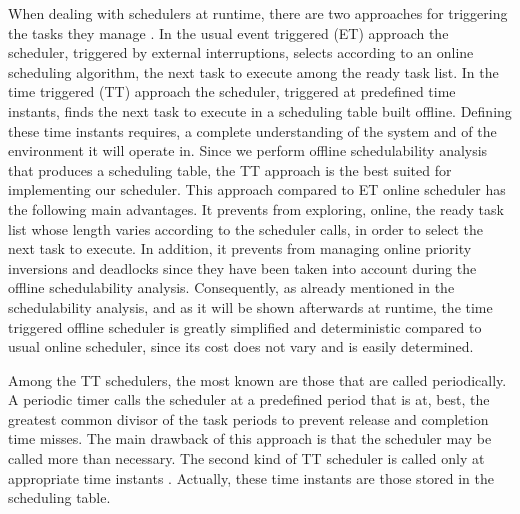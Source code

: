 \documentclass[conference,compsocconf]{IEEEtran}
\begin{document}
When dealing with schedulers at runtime, there are two approaches for
triggering the tasks they manage \cite{Kopetz98}. In the usual event triggered
(ET) approach the scheduler, triggered by external interruptions, selects
according to an online scheduling algorithm, the next task to execute among the
ready task list. In the time triggered (TT) approach the scheduler, triggered
at predefined time instants, finds the next task to execute in a scheduling
table built offline. Defining these time instants requires, a complete
understanding of the system and of the environment it will operate in.  Since
we perform offline schedulability analysis that produces a scheduling table,
the TT approach is the best suited for implementing our scheduler. This
approach compared to ET online scheduler has the following main advantages. It
prevents from exploring, online, the ready task list whose length varies
according to the scheduler calls, in order to select the next task to
execute. In addition, it prevents from managing online priority inversions and
deadlocks since they have been taken into account during the offline
schedulability analysis. Consequently, as already mentioned in the
schedulability analysis, and as it will be shown afterwards at runtime, the
time triggered offline scheduler is greatly simplified and deterministic
compared to usual online scheduler, since its cost does not vary and is easily
determined.


Among the TT schedulers, the most known are those that are called
periodically. A periodic timer calls the scheduler at a predefined period that
is at, best, the greatest common divisor of the task periods to prevent release
and completion time misses. The main drawback of this approach is that the
scheduler may be called more than necessary. The second kind of TT scheduler is
called only at appropriate time instants \cite{Kodancha07,Michael01}. Actually,
these time instants are those stored in the scheduling table.


\end{document}
